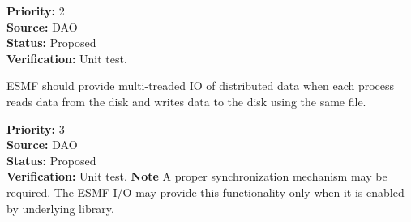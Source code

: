 \begin{reqlist}
{\bf Priority:} 2 \\
{\bf Source:} DAO \\
{\bf Status:} Proposed \\
{\bf Verification:} Unit test.
\end{reqlist}




ESMF should provide multi-treaded IO of distributed data when each
process reads data from the disk and writes data to the disk using the same 
file.  

\begin{reqlist}
{\bf Priority:} 3 \\
{\bf Source:} DAO \\
{\bf Status:} Proposed \\
{\bf Verification:} Unit test.
{\bf Note} A proper synchronization mechanism may be required. The ESMF I/O 
may provide this functionality only when it is enabled by underlying library. 
\end{reqlist}









